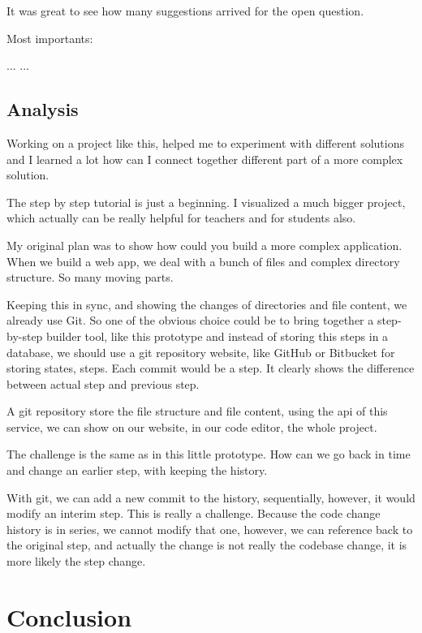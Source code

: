 \documentclass[12pt, a4paper, oneside, openright, medskipamount]{report}
\begin{document}
It was great to see how many suggestions arrived for the open question.

Most importants:

...
...




\section{Analysis}

Working on a project like this, helped me to experiment with different solutions and I learned a lot how can I connect together different part of a more complex solution.

The step by step tutorial is just a beginning. I visualized a much bigger project, which actually can be really helpful for teachers and for students also.

My original plan was to show how could you build a more complex application. When we build a web app, we deal with a bunch of files and complex directory structure. So many moving parts.

Keeping this in sync, and showing the changes of directories and file content, we already use Git. So one of the obvious choice could be to bring together a step-by-step builder tool, like this prototype and instead of storing this steps in a database, we should use a git repository website, like GitHub or Bitbucket for storing states, steps. Each commit would be a step. It clearly shows the difference between actual step and previous step.

A git repository store the file structure and file content, using the api of this service, we can show on our website, in our code editor, the whole project.

The challenge is the same as in this little prototype. How can we go back in time and change an earlier step, with keeping the history.

With git, we can add a new commit to the history, sequentially, however, it would modify an interim step. This is really a challenge. Because the code change history is in series, we cannot modify that one, however, we can reference back to the original step, and actually the change is not really the codebase change, it is more likely the step change.

\chapter{Conclusion}
\end{document}
